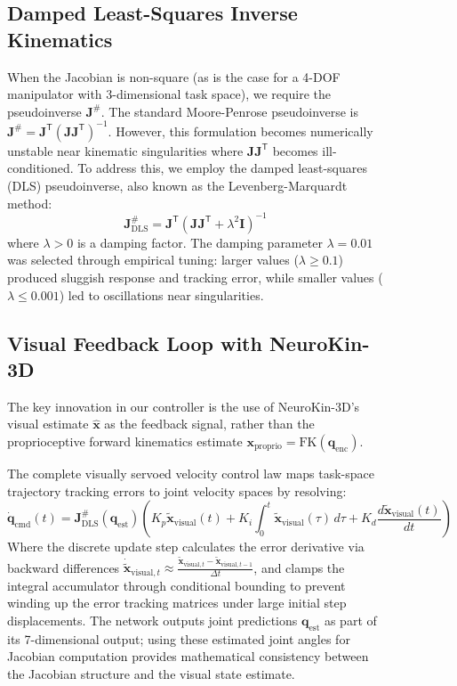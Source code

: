 \documentclass[12pt,a4paper,oneside]{report}
\begin{document}
\begin{figure}[H]
\subsection{Damped Least-Squares Inverse Kinematics}

When the Jacobian is non-square (as is the case for a 4-DOF manipulator with 3-dimensional task space), we require the pseudoinverse $\mathbf{J}^{\#}$. The standard Moore-Penrose pseudoinverse is $\mathbf{J}^{\#} = \mathbf{J}^{\mathsf{T}} (\mathbf{J} \mathbf{J}^{\mathsf{T}})^{-1}$. However, this formulation becomes numerically unstable near kinematic singularities where $\mathbf{J} \mathbf{J}^{\mathsf{T}}$ becomes ill-conditioned. To address this, we employ the damped least-squares (DLS) pseudoinverse, also known as the Levenberg-Marquardt method:
\begin{equation}
\mathbf{J}^{\#}_{\text{DLS}} = \mathbf{J}^{\mathsf{T}} (\mathbf{J} \mathbf{J}^{\mathsf{T}} + \lambda^2 \mathbf{I})^{-1}
\end{equation}
where $\lambda > 0$ is a damping factor. The damping parameter $\lambda = 0.01$ was selected through empirical tuning: larger values ($\lambda \geq 0.1$) produced sluggish response and tracking error, while smaller values ($\lambda \leq 0.001$) led to oscillations near singularities.

\subsection{Visual Feedback Loop with NeuroKin-3D}

The key innovation in our controller is the use of NeuroKin-3D's visual estimate $\hat{\mathbf{x}}$ as the feedback signal, rather than the proprioceptive forward kinematics estimate $\mathbf{x}_{\text{proprio}} = \text{FK}(\mathbf{q}_{\text{enc}})$. 

The complete visually servoed velocity control law maps task-space trajectory tracking errors to joint velocity spaces by resolving:
\begin{equation}
\dot{\mathbf{q}}_{\text{cmd}}(t) = \mathbf{J}^{\#}_{\text{DLS}}(\mathbf{q}_{\text{est}}) \left( K_p \tilde{\mathbf{x}}_{\text{visual}}(t) + K_i \int_{0}^{t} \tilde{\mathbf{x}}_{\text{visual}}(\tau) \, d\tau + K_d \frac{d\tilde{\mathbf{x}}_{\text{visual}}(t)}{dt} \right)
\end{equation}
Where the discrete update step calculates the error derivative via backward differences $\dot{\tilde{\mathbf{x}}}_{\text{visual}, t} \approx \frac{\tilde{\mathbf{x}}_{\text{visual}, t} - \tilde{\mathbf{x}}_{\text{visual}, t-1}}{\Delta t}$, and clamps the integral accumulator through conditional bounding to prevent winding up the error tracking matrices under large initial step displacements. The network outputs joint predictions $\mathbf{q}_{\text{est}}$ as part of its 7-dimensional output; using these estimated joint angles for Jacobian computation provides mathematical consistency between the Jacobian structure and the visual state estimate.


\end{figure}
\end{document}
